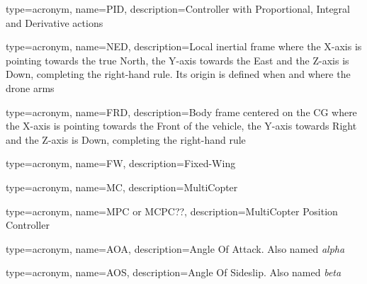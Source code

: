 {
	type=acronym,
	name={PID},
	description={Controller with Proportional, Integral and Derivative actions}
}

{
	type=acronym,
	name={NED},
	description={Local inertial frame where the X-axis is pointing towards the true North, the Y-axis towards the East and the Z-axis is Down, completing the right-hand rule. Its origin is defined when and where the drone arms}
}

{
	type=acronym,
	name={FRD},
	description={Body frame centered on the CG where the X-axis is pointing towards the Front of the vehicle, the Y-axis towards Right and the Z-axis is Down, completing the right-hand rule}
}

{
	type=acronym,
	name={FW},
	description={Fixed-Wing}
}

{
	type=acronym,
	name={MC},
	description={MultiCopter}
}

{
	type=acronym,
	name={MPC or MCPC??},
	description={MultiCopter Position Controller}
}

{
	type=acronym,
	name={AOA},
	description={Angle Of Attack. Also named \textit{alpha}}
}

{
	type=acronym,
	name={AOS},
	description={Angle Of Sideslip. Also named \textit{beta}}
}
